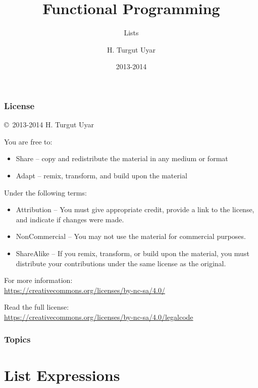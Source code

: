 \documentclass[dvipsnames]{beamer}
\title{Functional Programming}
\subtitle{Lists}
\author{H. Turgut Uyar}
\date{2013-2014}
\theoremstyle{plain}
\begin{document}
\begin{frame}
  \titlepage
\end{frame}

\begin{frame}
  \frametitle{License}

  \hfill
  \copyright~2013-2014 H. Turgut Uyar

  \vfill
  \begin{footnotesize}
    You are free to:
    \begin{itemize}
      \itemsep0em
      \item Share -- copy and redistribute the material in any medium or format
      \item Adapt -- remix, transform, and build upon the material
    \end{itemize}

    Under the following terms:
    \begin{itemize}
      \itemsep0em
      \item Attribution -- You must give appropriate credit, provide a link to
        the license, and indicate if changes were made.

      \item NonCommercial -- You may not use the material for commercial
        purposes.

      \item ShareAlike -- If you remix, transform, or build upon the material,
        you must distribute your contributions under the same license as the
        original.
    \end{itemize}
  \end{footnotesize}

  \begin{small}
    For more information:\\
    \url{https://creativecommons.org/licenses/by-nc-sa/4.0/}

    \smallskip
    Read the full license:\\
    \url{https://creativecommons.org/licenses/by-nc-sa/4.0/legalcode}
  \end{small}
\end{frame}

\begin{frame}
  \frametitle{Topics}
  \tableofcontents
\end{frame}

\section{List Expressions}
\end{document}

